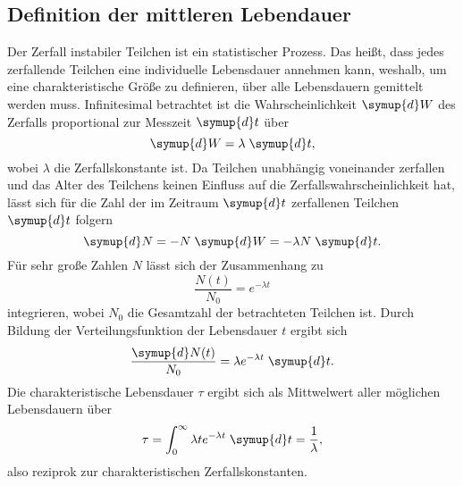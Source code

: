 \subsection{Definition der mittleren Lebendauer}
Der Zerfall instabiler Teilchen ist ein statistischer Prozess. Das heißt, dass jedes zerfallende 
Teilchen eine individuelle Lebensdauer annehmen kann, weshalb, um eine charakteristische Größe zu definieren, 
über alle Lebensdauern gemittelt werden muss. Infinitesimal betrachtet ist die Wahrscheinlichkeit $\symup{d}W$
des Zerfalls proportional zur Messzeit $\symup{d}t$ über 
\begin{equation*}
    \symup{d}W = \lambda \; \symup{d}t,
\end{equation*}
wobei $\lambda$ die Zerfallskonstante ist.
Da Teilchen unabhängig voneinander zerfallen und das Alter des Teilchens keinen Einfluss auf die Zerfallswahrscheinlichkeit 
hat, lässt sich für die Zahl der im Zeitraum $\symup{d}t$ zerfallenen Teilchen $\symup{d}t$ folgern
\begin{equation*}
    \symup{d} N = - N \; \symup{d}W = - \lambda N \; \symup{d}t.
\end{equation*}
Für sehr große Zahlen $N$ lässt sich der Zusammenhang zu 
\begin{equation*}
    \frac{N(t)}{N_0} = e^{-\lambda t}
\end{equation*}
integrieren, wobei $N_0$ die Gesamtzahl der betrachteten Teilchen ist.
Durch Bildung der Verteilungsfunktion der Lebensdauer $t$ ergibt sich 
\begin{equation*}
    \frac{\symup{d}N(t)}{N_0} = \lambda e^{-\lambda t} \; \symup{d}t.
\end{equation*}
Die charakteristische Lebensdauer $\tau$ ergibt sich als Mittwelwert aller möglichen Lebensdauern über 
\begin{equation*}
    \tau = \int_0^{\infty} \lambda t e^{-\lambda t} \; \symup{d} t = \frac{1}{\lambda},
\end{equation*}
also reziprok zur charakteristischen Zerfallskonstanten.